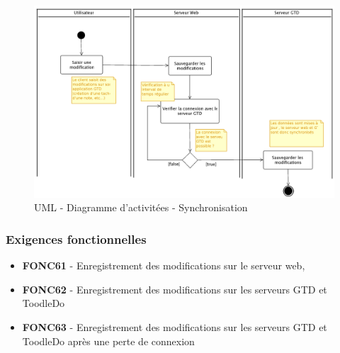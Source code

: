   \begin{figure}[H]
  \begin{center}
  \includegraphics[scale=0.2]{diagrams/activiteSynch.png}
  \caption{UML - Diagramme d'activitées - Synchronisation}
  \label{fig:Architecture Generale}
  \end{center}
  \end{figure}

\subsubsection{Exigences fonctionnelles}


\begin{itemize}	\renewcommand{\labelitemi}{}
	\item \textbf{FONC61} - Enregistrement des modifications sur le serveur web,
	\item \textbf{FONC62} - Enregistrement des modifications sur les serveurs GTD et ToodleDo
	\item \textbf{FONC63} - Enregistrement des modifications sur les serveurs GTD et ToodleDo après une perte de connexion
\end{itemize}
		


